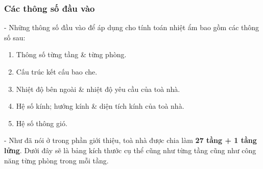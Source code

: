 \subsubsection{Các thông số đầu vào}
- Những thông số đầu vào để áp dụng cho tính toán nhiệt ẩm bao gồm các thông số sau:

\begin{enumerate}[leftmargin=2.2cm]
	\item Thông số từng tầng \& từng phòng.
	\item Cấu trúc kết cấu bao che.
	\item Nhiệt độ bên ngoài \& nhiệt độ yêu cầu của toà nhà.
	\item Hệ số kính; hướng kính \& diện tích kính của toà nhà.
	\item Hệ số thông gió.
\end{enumerate}

- Như đã nói ở trong phần giới thiệu, toà nhà được chia làm \textbf{27 tầng + 1 tầng lửng}. Dưới đây sẽ là bảng kích thước cụ thể cũng như từng tầng cũng như công năng từng phòng trong mỗi tầng.

